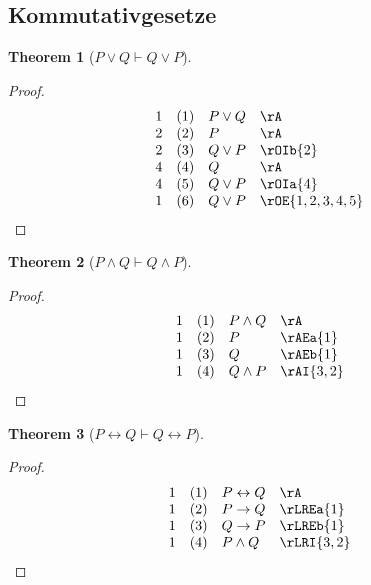 \documentclass{book}
\theoremstyle{plain}
\newtheorem{theorem}{Theorem}
\theoremstyle{remark}
\theoremstyle{definition}
\begin{document}
\subsection{Kommutativgesetze}

\label{POrQImpQOrP}
\begin{theorem}[\( P \lor Q \vdash Q\lor P \)]
\end{theorem}
\begin{proof}
	\[
	\begin{array}{llll}
		1 & (1) & P \lor Q & \rA \\
		2 & (2) & P & \rA \\
		2 & (3) & Q\lor P & \rOIb{2} \\
		4 & (4) & Q & \rA \\
		4 & (5) & Q\lor P & \rOIa{4} \\
		1 & (6) & Q\lor P & \rOE{1,2,3,4,5} \\		
	\end{array}
	\]
\end{proof}



\label{PAndQImpQAndP}
\begin{theorem}[\( P \land Q \vdash Q\land P \)]
\end{theorem}
\begin{proof}
	\[
	\begin{array}{llll}
		1 & (1) & P \land Q & \rA \\
		1 & (2) & P & \rAEa{1} \\
		1 & (3) & Q & \rAEb{1} \\
		1 & (4) & Q\land P & \rAI{3,2} \\
	\end{array}
	\]
\end{proof}	


\label{PLrQImpQLrP}
\begin{theorem}[\( P \leftrightarrow Q \vdash Q\leftrightarrow P \)]
\end{theorem}
\begin{proof}
	\[
	\begin{array}{llll}
		1 & (1) & P\leftrightarrow Q & \rA \\
		1 & (2) & P\rightarrow Q & \rLREa{1} \\
		1 & (3) & Q\rightarrow P & \rLREb{1} \\
		1 & (4) & P\land Q & \rLRI{3,2} \\
	\end{array}
	\]
\end{proof}	
\end{document}
